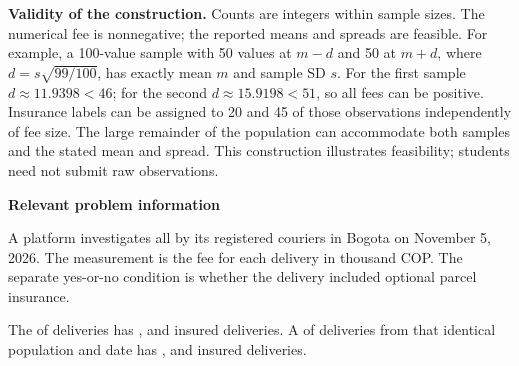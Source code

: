 

\textbf{Validity of the construction.} Counts are integers within sample sizes. The numerical fee is nonnegative; the reported means and spreads are feasible. For example, a 100-value sample with 50 values at $m-d$ and 50 at $m+d$, where $d=s\sqrt{99/100}$, has exactly mean $m$ and sample SD $s$. For the first sample $d\approx11.9398<46$; for the second $d\approx15.9198<51$, so all fees can be positive. Insurance labels can be assigned to 20 and 45 of those observations independently of fee size. The large remainder of the population can accommodate both samples and the stated mean and spread. This construction illustrates feasibility; students need not submit raw observations.

\secInicio[][sec:p3]

\clearpage



\textbf{Relevant problem information}

\begin{probleminfoexcerpt}
A platform investigates all    by its registered couriers in Bogota on November 5, 2026. The measurement is the fee for each delivery in thousand COP. The separate yes-or-no condition is whether the delivery included optional parcel insurance.
\end{probleminfoexcerpt}

\begin{probleminfoexcerpt}
The     of  deliveries has     ,       and  insured deliveries. A     of  deliveries from that identical population and date has     ,       and  insured deliveries.
\end{probleminfoexcerpt}


